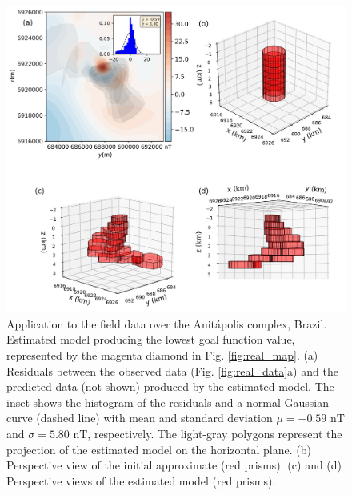 \begin{figure}
	\centering
	\includegraphics[scale=.5]{figures/real_results_magenta_diamond.png}
	\caption{Application to the field data over the Anit{\'a}polis complex, Brazil.
	Estimated model producing the lowest goal function value, 
	represented by the magenta diamond in Fig. \ref{fig:real_map}.
	(a) Residuals between the observed data (Fig. \ref{fig:real_data}a) and the 
	predicted data (not shown) produced by the estimated model. 
	The inset shows the histogram of the residuals and a normal 
	Gaussian curve (dashed line) with mean and standard deviation 
	$\mu = -0.59$ nT and $\sigma = 5.80$ nT, respectively.
	The light-gray polygons represent the projection of the estimated 
	model on the horizontal plane. 
	(b) Perspective view of the initial approximate (red prisms). 
	(c) and (d) Perspective views of the estimated model (red prisms).}
	\label{fig:real_result2}
\end{figure}

